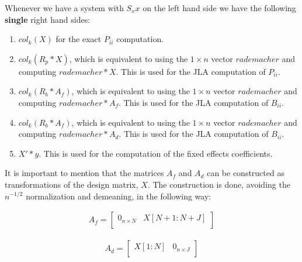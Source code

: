 \documentclass[12pt]{article}
\begin{document}
\clearpage 

Whenever we have a system with $S_xx$ on the left hand side we have the following \textbf{single} right hand sides: 

\begin{enumerate}
    \item $col_k(X)$ for the exact $P_{ii}$ computation.
    \item $col_k(R_p * X)$, which is equivalent to using the $1\times n$ vector $rademacher$ and computing $rademacher * X$. This is used for the JLA computation of $P_{ii}$.
    
    \item $col_k(R_b * A_f)$, which is equivalent to using the $1\times n$ vector $rademacher$ and computing $rademacher * A_f$. This is used for the JLA computation of $B_{ii}$.
    
    \item $col_k(R_b * A_f)$, which is equivalent to using the $1\times n$ vector $rademacher$ and computing $rademacher * A_d$. This is used for the JLA computation of $B_{ii}$.
    
    \item $X'*y$. This is used for the computation of the fixed effects coefficients.
\end{enumerate}

It is important to mention that the matrices $A_f$ and $A_d$ can be constructed as transformations of the design matrix, $X$. The construction is done, avoiding the $n^{-1/2}$ normalization and demeaning, in the following way: 

\begin{align}
    A_f =      \begin{bmatrix}
0_{n \times N} & X[N+1:N+J] \\
\end{bmatrix}   
\end{align}

\begin{align}
A_d  =   \begin{bmatrix}
  X[1:N] & 0_{n \times J} \\
\end{bmatrix}   
\end{align}
\end{document}

